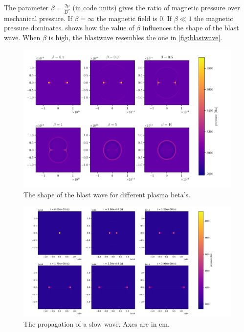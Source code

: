 \documentclass[a4paper]{article}
\begin{document}
The parameter $\beta = \frac{2p}{B^2}$ (in code units) gives the ratio of magnetic pressure over mechanical pressure. 
If $\beta = \infty$ the magnetic field is $0$. 
If $\beta \ll 1$ the magnetic pressure dominates. 
 shows how the value of $\beta$ influences the shape of the blast wave. When $\beta$ is high, the blastwave resembles the one in \cref{fig:blastwave}.
\begin{figure}[H]
	\centering
	\includegraphics[width = \linewidth]{figures/influence_beta.pdf}
	\caption{The shape of the blast wave for different plasma beta's.}
\label{fig:blastwave_shape_beta}
\end{figure}


\begin{figure}[H]
	\centering
	\includegraphics[width=\textwidth]{figures/slow_wave.pdf}
	\caption{The propagation of a slow wave. Axes are in \si{cm}.}
	\label{fig:Alfven_wave}
\end{figure}
\end{document}
